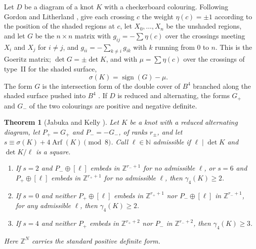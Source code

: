 \documentclass[11pt]{amsart}
\newtheorem{theorem}{Theorem}
\theoremstyle{definition}
\theoremstyle{remark}
\begin{document}
Let $D$ be a diagram of a knot $K$ with a checkerboard colouring. Following Gordon and
Litherland \cite{GoL}, give each crossing $c$ the weight $\eta(c)=\pm1$ according to the
position of the shaded regions at $c$, let $X_0,\dots,X_n$ be the unshaded regions, and let
$G$ be the $n\times n$ matrix with $g_{ij}=-\sum\eta(c)$ over the crossings meeting $X_i$
and $X_j$ for $i\ne j$, and $g_{ii}=-\sum_{k\ne i}g_{ik}$ with $k$ running from $0$ to $n$.
This is the Goeritz matrix; $\det G=\pm\det K$, and with $\mu=\sum\eta(c)$ over the crossings
of type~II for the shaded surface,
\begin{equation}\label{eq:gl}
\sigma(K)=\operatorname{sign}(G)-\mu .
\end{equation}
The form $G$ is the intersection form of the double cover of $B^4$ branched along the shaded
surface pushed into $B^4$ \cite{GoL}. If $D$ is reduced and alternating, the forms $G_+$ and
$G_-$ of the two colourings are positive and negative definite.

\begin{theorem}[Jabuka and Kelly {\cite[Theorems 2.10--2.12]{JK}}]\label{thm:jk}
Let $K$ be a knot with a reduced alternating diagram, let $P_+=G_+$ and $P_-=-G_-$, of ranks
$r_\pm$, and let $s\equiv\sigma(K)+4\operatorname{Arf}(K)\pmod 8$. Call $\ell\in\mathbb N$
admissible if $\ell\mid\det K$ and $\det K/\ell$ is a square.
\begin{enumerate}
\item If $s=2$ and $P_-\oplus[\ell]$ embeds in $\mathbb Z^{r_-+1}$ for no admissible
$\ell$, or $s=6$ and $P_+\oplus[\ell]$ embeds in $\mathbb Z^{r_++1}$ for no admissible
$\ell$, then $\gamma_4(K)\ge2$.
\item If $s=0$ and neither $P_+\oplus[\ell]$ embeds in $\mathbb Z^{r_++1}$ nor
$P_-\oplus[\ell]$ in $\mathbb Z^{r_-+1}$, for any admissible $\ell$, then $\gamma_4(K)\ge2$.
\item If $s=4$ and neither $P_+$ embeds in $\mathbb Z^{r_++2}$ nor $P_-$ in
$\mathbb Z^{r_-+2}$, then $\gamma_4(K)\ge3$.
\end{enumerate}
Here $\mathbb Z^N$ carries the standard positive definite form.
\end{theorem}
\end{document}
